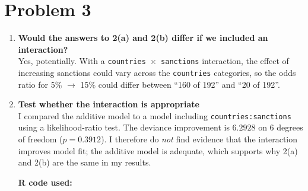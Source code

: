 \documentclass[12pt,letterpaper]{article}
\begin{document}
\newpage
\section*{Problem 3}

\begin{enumerate}
	\item[(i)] \textbf{Would the answers to 2(a) and 2(b) differ if we included an interaction?}\\
	Yes, potentially. With a \texttt{countries $\times$ sanctions} interaction, the effect of increasing sanctions could vary across the \texttt{countries} categories, so the odds ratio for 5\% $\to$ 15\% could differ between ``160 of 192'' and ``20 of 192''.
	
	\item[(ii)] \textbf{Test whether the interaction is appropriate}\\
	I compared the additive model to a model including \texttt{countries:sanctions} using a likelihood-ratio test. The deviance improvement is $6.2928$ on $6$ degrees of freedom ($p=0.3912$). I therefore do \emph{not} find evidence that the interaction improves model fit; the additive model is adequate, which supports why 2(a) and 2(b) are the same in my results.

\noindent\textbf{R code used:}


	

\end{enumerate}
\end{document}
